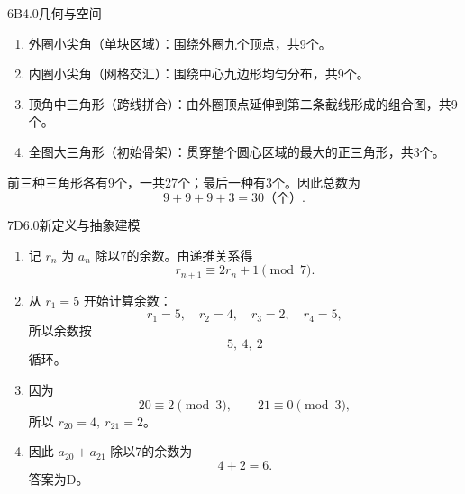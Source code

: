 \begin{solution}{6}{B}{4.0}{几何与空间}
\begin{enumerate}[label=\textbf{Step \arabic*:},leftmargin=*]
  \item 外圈小尖角（单块区域）：围绕外圈九个顶点，共9个。
  \item 内圈小尖角（网格交汇）：围绕中心九边形均匀分布，共9个。
  \item 顶角中三角形（跨线拼合）：由外圈顶点延伸到第二条截线形成的组合图，共9个。
  \item 全图大三角形（初始骨架）：贯穿整个圆心区域的最大的正三角形，共3个。
\end{enumerate}
前三种三角形各有9个，一共27个；最后一种有3个。因此总数为
\[
  9+9+9+3=30\text{（个）}.
\]
\end{solution}

\begin{solution}{7}{D}{6.0}{新定义与抽象建模}
\begin{enumerate}[label=\textbf{Step \arabic*:},leftmargin=*]
  \item 记 \(r_n\) 为 \(a_n\) 除以7的余数。由递推关系得
  \[
    r_{n+1}\equiv2r_n+1\pmod 7.
  \]
  \item 从 \(r_1=5\) 开始计算余数：
  \[
    r_1=5,\quad r_2=4,\quad r_3=2,\quad r_4=5,
  \]
  所以余数按
  \[
    5,\ 4,\ 2
  \]
  循环。
  \item 因为
  \[
    20\equiv2\pmod3,\qquad21\equiv0\pmod3,
  \]
  所以 \(r_{20}=4,\ r_{21}=2\)。
  \item 因此 \(a_{20}+a_{21}\) 除以7的余数为
  \[
    4+2=6.
  \]
  答案为D。
\end{enumerate}
\end{solution}

